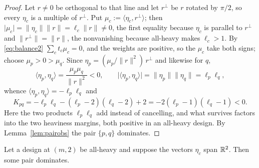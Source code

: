 \begin{proof}
Let $r\ne0$ be orthogonal to that line and let $r^{\perp}$ be $r$ rotated
by $\pi/2$, so every $\eta_c$ is a multiple of $r^{\perp}$.  Put
$\mu_c:=\langle \eta_c,r^{\perp}\rangle$; then $\lvert\mu_c\rvert=\lVert
\eta_c\rVert\lVert r\rVert=\ell_c\lVert r\rVert\ne0$, the first equality
because $\eta_c$ is parallel to $r^{\perp}$ and $\lVert
r^{\perp}\rVert=\lVert r\rVert$, the nonvanishing because all-heavy makes
$\ell_c>1$.  By
\eqref{eq:balance2} $\sum_ct_c\mu_c=0$, and the weights are positive, so
the $\mu_c$ take both signs; choose $\mu_p>0>\mu_q$.  Since
$\eta_p=(\mu_p/\lVert r\rVert^2)\,r^{\perp}$ and likewise for $q$,
\[
  \langle \eta_p,\eta_q\rangle=\frac{\mu_p\mu_q}{\lVert r\rVert^2}<0,
  \qquad
  \lvert\langle \eta_p,\eta_q\rangle\rvert=\lVert \eta_p\rVert\lVert \eta_q\rVert
  =\ell_p\ell_q ,
\]
whence $\langle \eta_p,\eta_q\rangle=-\ell_p\ell_q$ and
\[
  K_{pq}=-\ell_p\ell_q-(\ell_p-2)(\ell_q-2)+2
        =-2(\ell_p-1)(\ell_q-1)<0 .
\]
Here the two products $\ell_p\ell_q$ add instead of cancelling, and what
survives factors into the two heaviness margins, both positive in an
all-heavy design.  By Lemma~\ref{lem:pairobs} the pair $\{p,q\}$
dominates.
\end{proof}

\begin{lemma}\label{lem:spanning}
Let a design at $(m,2)$ be all-heavy and suppose the vectors $\eta_c$ span
$\mathbb{R}^2$.  Then some pair dominates.
\end{lemma}


